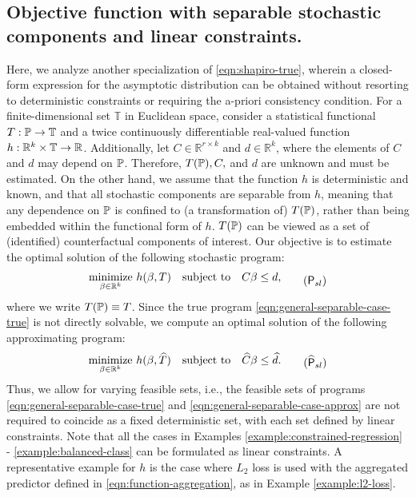 \subsection{Objective function with separable stochastic components and linear constraints.}
Here, we analyze another specialization of \ref{eqn:shapiro-true}, wherein a closed-form expression for the asymptotic distribution can be obtained without resorting to deterministic constraints or requiring the a-priori consistency condition.
For a finite-dimensional set $\mathbb{T}$ in Euclidean space, consider a statistical functional $T: \mathbb{P} \rightarrow \mathbb{T}$ and a twice continuously differentiable real-valued function $h:\mathbb{R}^k \times \mathbb{T} \rightarrow \mathbb{R}$. Additionally, let $C \in \mathbb{R}^{r \times k}$ and $d \in \mathbb{R}^{k}$, where the elements of $C$ and $d$ may depend on $\mathbb{P}$. Therefore, $T(\mathbb{P}), C,$ and $d$ are unknown and must be estimated. On the other hand, we assume that the function $h$ is deterministic and known, and that all stochastic components are separable from $h$, meaning that any dependence on $\mathbb{P}$ is confined to (a transformation of) $T(\mathbb{P})$, rather than being embedded within the functional form of $h$. $T(\mathbb{P})$ can be viewed as a set of (identified) counterfactual components of interest. Our objective is to estimate the optimal solution of the following stochastic program:
\begin{equation}
\label{eqn:general-separable-case-true}
\begin{aligned}    
    \underset{\beta \in \R^k}{\text{minimize}} \,\,  h(\beta, T)  
    \quad \text{subject to} \quad C\beta \leq d,
\end{aligned}       \tag{$\mathsf{P}_{sl}$}
\end{equation}
where we write $T(\mathbb{P}) \equiv T$. Since the true program \eqref{eqn:general-separable-case-true} is not directly solvable, we compute an optimal solution of the following approximating program:
\begin{equation}
\label{eqn:general-separable-case-approx}
\begin{aligned}    
    \underset{\beta \in \R^k}{\text{minimize}} \,\,  h(\beta, \widehat{T})  
    \quad \text{subject to} \quad \widehat{C}\beta \leq \widehat{d}.
\end{aligned}       \tag{$\widehat{\mathsf{P}}_{sl}$}  
\end{equation}
Thus, we allow for varying feasible sets, i.e., the feasible sets of programs \ref{eqn:general-separable-case-true} and \ref{eqn:general-separable-case-approx} are not required to coincide as a fixed deterministic set, with each set defined by linear constraints. Note that all the cases in Examples \ref{example:constrained-regression} - \ref{example:balanced-class} can be formulated as linear constraints. A representative example for $h$ is the case where $L_2$ loss is used with the aggregated predictor defined in \eqref{eqn:function-aggregation}, as in Example \ref{example:l2-loss}.

